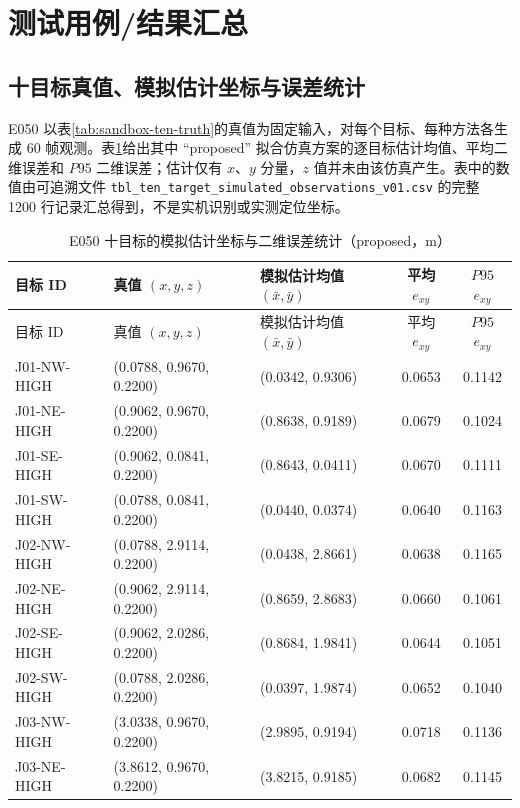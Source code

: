 \documentclass[UTF8,a4paper,12pt]{ctexart}
\begin{document}
\section{测试用例/结果汇总}
\subsection{十目标真值、模拟估计坐标与误差统计}
E050 以表\ref{tab:sandbox-ten-truth}的真值为固定输入，对每个目标、每种方法各生成 60 帧观测。表\ref{tab:ten-target-estimate}给出其中 ``proposed'' 拟合仿真方案的逐目标估计均值、平均二维误差和 $P95$ 二维误差；估计仅有 $x$、$y$ 分量，$z$ 值并未由该仿真产生。表中的数值由可追溯文件 \texttt{tbl\_ten\_target\_simulated\_observations\_v01.csv} 的完整 1200 行记录汇总得到，不是实机识别或实测定位坐标。

\begin{longtable}{p{2.7cm}p{2.7cm}p{2.8cm}cc}
\caption{E050 十目标的模拟估计坐标与二维误差统计（proposed，m）}\label{tab:ten-target-estimate}\\
\toprule
目标 ID & 真值 $(x,y,z)$ & 模拟估计均值 $(\bar{x},\bar{y})$ & 平均 $e_{xy}$ & $P95$ $e_{xy}$ \\
\midrule
\endfirsthead
\toprule
目标 ID & 真值 $(x,y,z)$ & 模拟估计均值 $(\bar{x},\bar{y})$ & 平均 $e_{xy}$ & $P95$ $e_{xy}$ \\
\midrule
\endhead
J01-NW-HIGH & (0.0788, 0.9670, 0.2200) & (0.0342, 0.9306) & 0.0653 & 0.1142 \\
J01-NE-HIGH & (0.9062, 0.9670, 0.2200) & (0.8638, 0.9189) & 0.0679 & 0.1024 \\
J01-SE-HIGH & (0.9062, 0.0841, 0.2200) & (0.8643, 0.0411) & 0.0670 & 0.1111 \\
J01-SW-HIGH & (0.0788, 0.0841, 0.2200) & (0.0440, 0.0374) & 0.0640 & 0.1163 \\
J02-NW-HIGH & (0.0788, 2.9114, 0.2200) & (0.0438, 2.8661) & 0.0638 & 0.1165 \\
J02-NE-HIGH & (0.9062, 2.9114, 0.2200) & (0.8659, 2.8683) & 0.0660 & 0.1061 \\
J02-SE-HIGH & (0.9062, 2.0286, 0.2200) & (0.8684, 1.9841) & 0.0644 & 0.1051 \\
J02-SW-HIGH & (0.0788, 2.0286, 0.2200) & (0.0397, 1.9874) & 0.0652 & 0.1040 \\
J03-NW-HIGH & (3.0338, 0.9670, 0.2200) & (2.9895, 0.9194) & 0.0718 & 0.1136 \\
J03-NE-HIGH & (3.8612, 0.9670, 0.2200) & (3.8215, 0.9185) & 0.0682 & 0.1145 \\
\bottomrule
\end{longtable}
\end{document}
